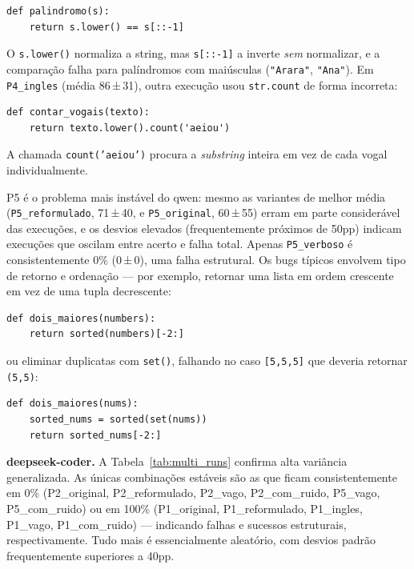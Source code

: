 \documentclass[12pt,
    english,
    french,
    spanish,
    brazil,
    ]{article}
\begin{document}
\begin{lstlisting}[style=python, caption={qwen2.5-coder em P2\_com\_ruido (uma das runs) — normalização de maiúsculas incompleta}]
def palindromo(s):
    return s.lower() == s[::-1]
\end{lstlisting}

O \texttt{s.lower()} normaliza a string, mas \texttt{s[::-1]} a inverte \textit{sem} normalizar, e a comparação falha para palíndromos com maiúsculas (\texttt{"Arara"}, \texttt{"Ana"}). Em \texttt{P4\_ingles} (média 86\,±\,31), outra execução usou \texttt{str.count} de forma incorreta:

\begin{lstlisting}[style=python, caption={qwen2.5-coder em P4\_ingles (uma das runs) — erro de semântica da API}]
def contar_vogais(texto):
    return texto.lower().count('aeiou')
\end{lstlisting}

A chamada \texttt{count('aeiou')} procura a \textit{substring} inteira em vez de cada vogal individualmente.

P5 é o problema mais instável do qwen: mesmo as variantes de melhor média (\texttt{P5\_reformulado}, 71\,±\,40, e \texttt{P5\_original}, 60\,±\,55) erram em parte considerável das execuções, e os desvios elevados (frequentemente próximos de 50pp) indicam execuções que oscilam entre acerto e falha total. Apenas \texttt{P5\_verboso} é consistentemente 0\% (0\,±\,0), uma falha estrutural. Os bugs típicos envolvem tipo de retorno e ordenação — por exemplo, retornar uma lista em ordem crescente em vez de uma tupla decrescente:

\begin{lstlisting}[style=python, caption={qwen2.5-coder em P5\_ingles — erro de tipo de retorno}]
def dois_maiores(numbers):
    return sorted(numbers)[-2:]
\end{lstlisting}

ou eliminar duplicatas com \texttt{set()}, falhando no caso \texttt{[5,5,5]} que deveria retornar \texttt{(5,5)}:

\begin{lstlisting}[style=python, caption={qwen2.5-coder em P5\_verboso — retorna lista com set (perde duplicatas)}]
def dois_maiores(nums):
    sorted_nums = sorted(set(nums))
    return sorted_nums[-2:]
\end{lstlisting}

\textbf{deepseek-coder.} A Tabela~\ref{tab:multi_runs} confirma alta variância generalizada. As únicas combinações estáveis são as que ficam consistentemente em 0\% (P2\_original, P2\_reformulado, P2\_vago, P2\_com\_ruido, P5\_vago, P5\_com\_ruido) ou em 100\% (P1\_original, P1\_reformulado, P1\_ingles, P1\_vago, P1\_com\_ruido) — indicando falhas e sucessos estruturais, respectivamente. Tudo mais é essencialmente aleatório, com desvios padrão frequentemente superiores a 40pp.
\end{document}
